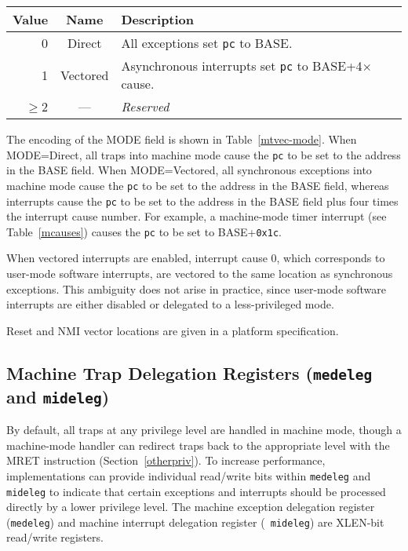 \begin{table*}[h!]
\begin{center}
\begin{tabular}{|r|c|l|}
\hline
Value & Name & Description \\
\hline	 
0      & Direct   & All exceptions set {\tt pc} to BASE. \\
1      & Vectored & Asynchronous interrupts set {\tt pc} to BASE+4$\times$cause. \\
$\ge$2 & --- & {\em Reserved} \\
\hline
\end{tabular}
\end{center}
\caption{Encoding of {\tt mtvec} MODE field.}
\label{mtvec-mode}
\end{table*}

The encoding of the MODE field is shown in Table~\ref{mtvec-mode}.  When
MODE=Direct, all traps into machine mode cause the {\tt pc} to be set to the
address in the BASE field.  When MODE=Vectored, all synchronous exceptions
into machine mode cause the {\tt pc} to be set to the address in the BASE
field, whereas interrupts cause the {\tt pc} to be set to the address in
the BASE field plus four times the interrupt cause number.  For example,
a machine-mode timer interrupt (see Table~\ref{mcauses}) causes the {\tt pc}
to be set to BASE+{\tt 0x1c}.

\begin{commentary}
When vectored interrupts are enabled, interrupt cause 0, which corresponds to
user-mode software interrupts, are vectored to the same location as
synchronous exceptions.  This ambiguity does not arise in practice, since
user-mode software interrupts are either disabled or delegated to
a less-privileged mode.
\end{commentary}

\begin{commentary}
Reset and NMI vector locations are given in a platform specification.
\end{commentary}

\subsection{Machine Trap Delegation Registers ({\tt medeleg} and {\tt mideleg})}

By default, all traps at any privilege level are handled in machine
mode, though a machine-mode handler can redirect traps back to the
appropriate level with the MRET instruction (Section~\ref{otherpriv}).
To increase performance, implementations can provide individual
read/write bits within {\tt medeleg} and {\tt mideleg} to indicate
that certain exceptions and interrupts should be processed directly by
a lower privilege level.  The machine exception delegation register
({\tt medeleg}) and machine interrupt delegation register ({\tt
  mideleg}) are XLEN-bit read/write registers.

